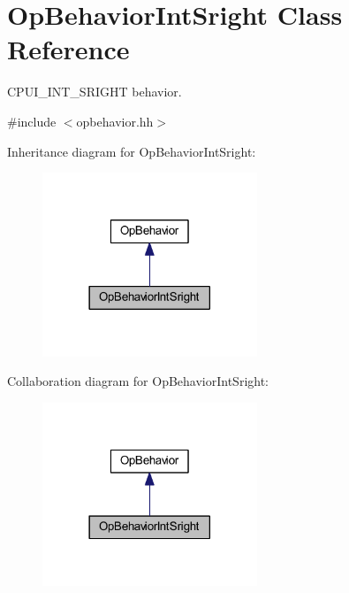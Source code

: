 \hypertarget{class_op_behavior_int_sright}{}\section{Op\+Behavior\+Int\+Sright Class Reference}
\label{class_op_behavior_int_sright}


C\+P\+U\+I\+\_\+\+I\+N\+T\+\_\+\+S\+R\+I\+G\+HT behavior.  




{\ttfamily \#include $<$opbehavior.\+hh$>$}



Inheritance diagram for Op\+Behavior\+Int\+Sright\+:
\nopagebreak
\begin{figure}[H]
\begin{center}
\leavevmode
\includegraphics[width=182pt]{class_op_behavior_int_sright__inherit__graph}
\end{center}
\end{figure}


Collaboration diagram for Op\+Behavior\+Int\+Sright\+:
\nopagebreak
\begin{figure}[H]
\begin{center}
\leavevmode
\includegraphics[width=182pt]{class_op_behavior_int_sright__coll__graph}
\end{center}
\end{figure}
